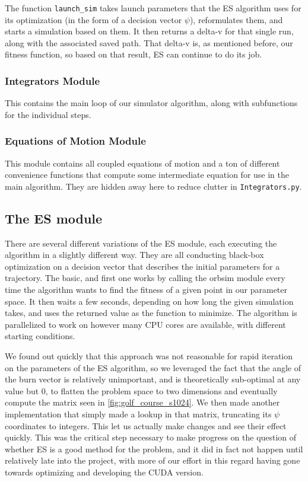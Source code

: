 \noindent The function \texttt{launch\_sim} takes launch parameters that the ES algorithm uses for its optimization (in the form of a decision vector \(\psi\)), reformulates them, and starts a simulation based on them. It then returns a delta-v for that single run, along with the associated saved path. That delta-v is, as mentioned before, our fitness function, so based on that result, ES can continue to do its job.

\subsubsection{Integrators Module}

This contains the main loop of our simulator algorithm, along with subfunctions for the individual steps.

\subsubsection{Equations of Motion Module}

This module contains all coupled equations of motion and a ton of different convenience functions that compute some intermediate equation for use in the main algorithm. They are hidden away here to reduce clutter in \texttt{Integrators.py}.

\subsection{The ES module}
There are several different variations of the ES module, each executing the algorithm in a slightly different way. They are all conducting black-box optimization on a decision vector that describes the initial parameters for a trajectory. The basic, and first one works by calling the orbsim module every time the algorithm wants to find the fitness of a given point in our parameter space. It then waits a few seconds, depending on how long the given simulation takes, and uses the returned value as the function to minimize. The algorithm is parallelized to work on however many CPU cores are available, with different starting conditions.

We found out quickly that this approach was not reasonable for rapid iteration on the parameters of the ES algorithm, so we leveraged the fact that the angle of the burn vector is relatively unimportant, and is theoretically sub-optimal at any value but 0, to flatten the problem space to two dimensions and eventually compute the matrix seen in \cref{fig:golf_course_s1024}. We then made another implementation that simply made a lookup in that matrix, truncating its $\psi$ coordinates to integers. This let us actually make changes and see their effect quickly. This was the critical step necessary to make progress on the question of whether ES is a good method for the problem, and it did in fact not happen until relatively late into the project, with more of our effort in this regard having gone towards optimizing and developing the CUDA version.

